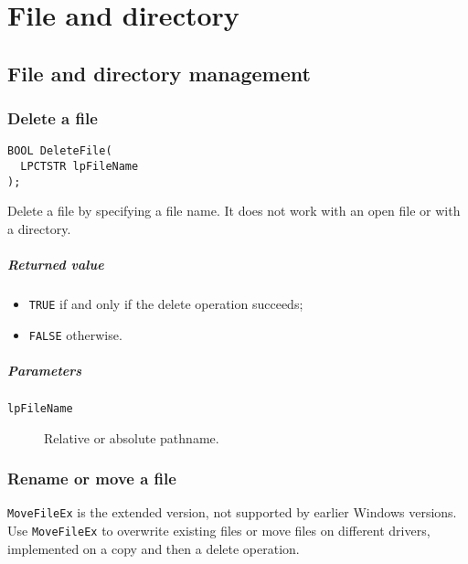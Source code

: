 \chapter{File and directory}
\section{File and directory management}
\subsection{Delete a file}
\begin{verbatim}
BOOL DeleteFile(
  LPCTSTR lpFileName
);
\end{verbatim}

Delete a file by specifying a file name. It does not work with an open file or with a directory.

\paragraph{Returned value}
\begin{itemize}
\item \texttt{TRUE} if and only if the delete operation succeeds;
\item \texttt{FALSE} otherwise.
\end{itemize}

\paragraph{Parameters}
\begin{description}
\item [\texttt{lpFileName}] Relative or absolute pathname.
\end{description}

\subsection{Rename or move a file}
\texttt{MoveFileEx} is the extended version, not supported by earlier Windows versions. Use \texttt{MoveFileEx} to overwrite existing files or move files on different drivers, implemented on a copy and then a delete operation.

\begin{Parallel}{}{}
\end{Parallel}

